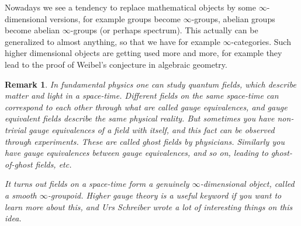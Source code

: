 \documentclass{article}
\newtheorem{remark}{Remark}
\begin{document}



Nowadays we see a tendency to replace mathematical objects by some $\infty$-dimensional versions, for example groups become $\infty$-groups, abelian groups become abelian $\infty$-groups (or perhaps spectrum). This actually can be generalized to almost anything, so that we have for example $\infty$-categories. Such higher dimensional objects are getting used more and more, for example they lead to the proof of Weibel's conjecture in algebraic geometry.

\begin{remark}
In fundamental physics one can study quantum fields, which describe matter and light in a space-time. Different fields on the same space-time can correspond to each other through what are called gauge equivalences, and gauge equivalent fields describe the same physical reality. But sometimes you have non-trivial gauge equivalences of a field with itself, and this fact can be observed through experiments. These are called ghost fields by physicians. Similarly you have gauge equivalences between gauge equivalences, and so on, leading to ghost-of-ghost fields, etc.

It turns out fields on a space-time form a genuinely $\infty$-dimensional object, called a smooth $\infty$-groupoid. \emph{Higher gauge theory} is a useful keyword if you want to learn more about this, and Urs Schreiber wrote a lot of interesting things on this idea.
\end{remark}
\end{document}
